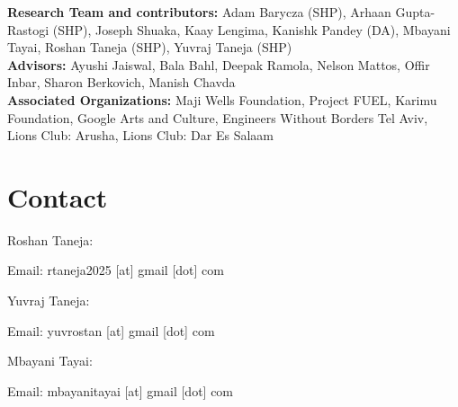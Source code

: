 \documentclass[10pt, twocolumn]{article}
\begin{document}
\textbf{Research Team and contributors:} Adam Barycza (SHP), Arhaan Gupta-Rastogi (SHP), Joseph Shuaka, Kaay Lengima, Kanishk Pandey (DA), Mbayani Tayai, Roshan Taneja (SHP), Yuvraj Taneja (SHP)
\\ \newline
\textbf{Advisors:} Ayushi Jaiswal, Bala Bahl, Deepak Ramola, Nelson Mattos, Offir Inbar, Sharon Berkovich, Manish Chavda
\\ \newline
\textbf{Associated Organizations:} Maji Wells Foundation, Project FUEL, Karimu Foundation, Google Arts and Culture, Engineers Without Borders Tel Aviv, Lions Club: Arusha, Lions Club: Dar Es Salaam

\nocite{*}
\printbibliography

\section*{Contact}

Roshan Taneja:

Email: rtaneja2025 [at] gmail [dot] com
\newline

Yuvraj Taneja:

Email: yuvrostan [at] gmail [dot] com
\newline

Mbayani Tayai:

Email: mbayanitayai [at] gmail [dot] com
\end{document}
